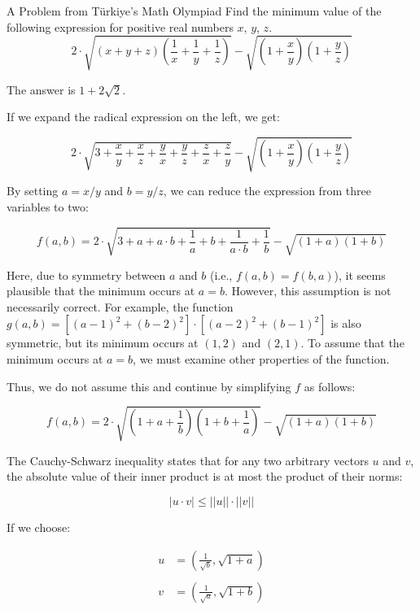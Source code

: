 \begin{problem}{}{A Problem from Türkiye's Math Olympiad}
Find the minimum value of the following expression for positive real numbers $x$, $y$, $z$.
$$
2 \cdot \sqrt{(x + y + z) \left(\frac{1}{x} + \frac{1}{y} + \frac{1}{z} \right)} - \sqrt{\left(1 + \frac{x}{y} \right) \left(1 + \frac{y}{z} \right)}
$$
\end{problem}

\begin{solution}
The answer is $1 + 2 \sqrt{2}$.

If we expand the radical expression on the left, we get:

\[
2 \cdot \sqrt{3 + \frac{x}{y} + \frac{x}{z} + \frac{y}{x} + \frac{y}{z} + \frac{z}{x} + \frac{z}{y}} - \sqrt{\left(1 + \frac{x}{y} \right) \left(1 + \frac{y}{z} \right)}
\]

By setting $a = x/y$ and $b = y/z$, we can reduce the expression from three variables to two:

\[
f(a, b) = 2 \cdot \sqrt{3 + a + a \cdot b + \frac{1}{a} + b + \frac{1}{a \cdot b} + \frac{1}{b}} - \sqrt{(1 + a) (1 + b)}
\]

Here, due to symmetry between $a$ and $b$ (i.e., $f(a,b) = f(b,a)$), it seems plausible that the minimum occurs at $a = b$. However, this assumption is not necessarily correct. For example, the function $g(a,b) = [(a-1)^2+(b-2)^2]\cdot[(a-2)^2+(b-1)^2]$ is also symmetric, but its minimum occurs at $(1,2)$ and $(2,1)$. To assume that the minimum occurs at $a=b$, we must examine other properties of the function.

Thus, we do not assume this and continue by simplifying $f$ as follows:

\[
f(a, b) = 2 \cdot \sqrt{\left(1 + a + \frac{1}{b}\right)\left(1 + b + \frac{1}{a}\right)} - \sqrt{(1 + a) (1 + b)}
\]

The Cauchy-Schwarz inequality states that for any two arbitrary vectors $u$ and $v$, the absolute value of their inner product is at most the product of their norms:

\[
|u \cdot v| \leq ||u|| \cdot ||v||
\]

If we choose:

\[
\begin{aligned}
u &= \left(\frac{1}{\sqrt{b}}, \sqrt{1+a}\right) \\\\
v &= \left(\frac{1}{\sqrt{a}}, \sqrt{1+b}\right)
\end{aligned} 
\]


\end{solution}

